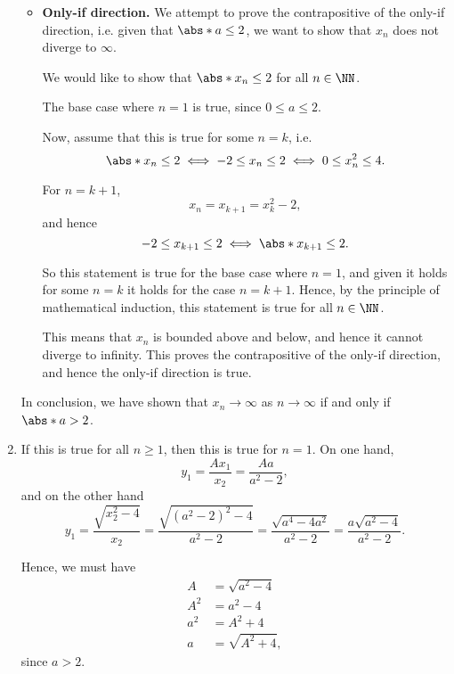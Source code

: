 \begin{enumerate}
\begin{itemize}
              \item \textbf{Only-if direction.} We attempt to prove the contrapositive of the only-if direction, i.e. given that \(\abs*{a} \leq 2\), we want to show that \(x_n\) does not diverge to \(\infty\).

                    We would like to show that \(\abs*{x_n} \leq 2\) for all \(n \in \NN\).

                    The base case where \(n = 1\) is true, since \(0 \leq a \leq 2\).

                    Now, assume that this is true for some \(n = k\), i.e.
                    \[
                        \abs*{x_n} \leq 2 \iff -2 \leq x_n \leq 2 \iff 0 \leq x_n^2 \leq 4.
                    \]

                    For \(n = k + 1\),
                    \[
                        x_n = x_{k + 1} = x_k^2 - 2,
                    \]
                    and hence
                    \[
                        -2 \leq x_{k + 1} \leq 2 \iff \abs*{x_{k + 1}} \leq 2.
                    \]

                    So this statement is true for the base case where \(n = 1\), and given it holds for some \(n = k\) it holds for the case \(n = k + 1\). Hence, by the principle of mathematical induction, this statement is true for all \(n \in \NN\).

                    This means that \(x_n\) is bounded above and below, and hence it cannot diverge to infinity. This proves the contrapositive of the only-if direction, and hence the only-if direction is true.
          \end{itemize}

          In conclusion, we have shown that \(x_n \to \infty\) as \(n \to \infty\) if and only if \(\abs*{a} > 2\).

    \item If this is true for all \(n \geq 1\), then this is true for \(n = 1\). On one hand,
          \[
              y_{1} = \frac{A x_1}{x_2} = \frac{A a}{a^2 - 2},
          \]
          and on the other hand
          \[
              y_{1} = \frac{\sqrt{x_2^2 - 4}}{x_2} = \frac{\sqrt{(a^2 - 2)^2 - 4}}{a^2 - 2} = \frac{\sqrt{a^4 - 4a^2}}{a^2 - 2} = \frac{a \sqrt{a^2 - 4}}{a^2 - 2}.
          \]

          Hence, we must have
          \begin{align*}
              A   & = \sqrt{a^2 - 4}  \\
              A^2 & = a^2 - 4         \\
              a^2 & = A^2 + 4         \\
              a   & = \sqrt{A^2 + 4},
          \end{align*}
          since \(a > 2\).


\end{enumerate}
